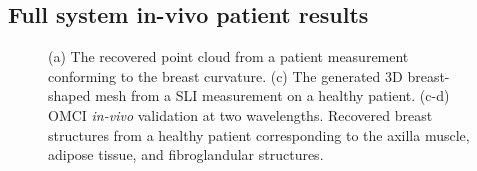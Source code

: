 \subsection{Full system in-vivo patient results}
\begin{figure}[]
    \begin{center}
    \end{center}
    \caption{(a) The recovered point cloud from a patient measurement conforming to the breast curvature. (c) The generated 3D breast-shaped mesh from a SLI measurement on a healthy patient. (c-d) OMCI \textit{in-vivo} validation at two wavelengths. Recovered breast structures from a healthy patient corresponding to the axilla muscle, adipose tissue, and fibroglandular structures.} 
    \label{fig:PatientResults}
\end{figure} 

